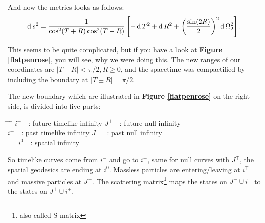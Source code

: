 	And now the metrics looks as follows:
		\begin{equation} \label{TRmetric}
			\operatorname{d} s^2=
			\frac{1}{\cos^2(T+R)\cos^2(T-R)}
			\left[- \operatorname{d} T^2+ \operatorname{d} R^2+\left(\frac{\sin(2R)}{2}\right)^2 \operatorname{d} \Omega^2_2 \right].
		\end{equation}	
					
	This seems to be quite complicated, but if you have a look at \textbf{Figure \ref{flatpenrose}}, you will see, why we were doing this. The new ranges of our coordinates are $|T \pm R|< \pi/2, R\geq0$, and the spacetime was compactified by including the boundary at $|T \pm R| = \pi/2$. 
	
	The new boundary which are illustrated in \textbf{Figure \ref{flatpenrose}} on the right side, is divided into five parts:	
		\begin{tabbing}
			\hspace{0.1\linewidth} \= \hspace{0.4\linewidth} \= \hspace{0.1\linewidth} \= \hfill \kill
			$i^+$~~: \> future timelike infinity \> $J^+$~~: \> future null infinity \\
			$i^-$~~: \> past timelike infinity \> $J^-$~~: \> past null infinity\\
			\hspace{0.35\linewidth} \= \hspace{0.1\linewidth} \= \hfill \kill	
			~ \> $i^0$~~: \> spatial infinity 
		\end{tabbing}
	So timelike curves come from $i^-$ and go to $i^+$, same for null curves with $J^\mp$, the spatial geodesics are ending at $i^0$. Massless particles are entering/leaving at $i^\mp$ and massive particles at $J^\mp$. The scattering matrix\footnote{also called S-matrix} maps the states on $J^- \cup i^-$ to the states on $J^+ \cup i^+$.	
	
